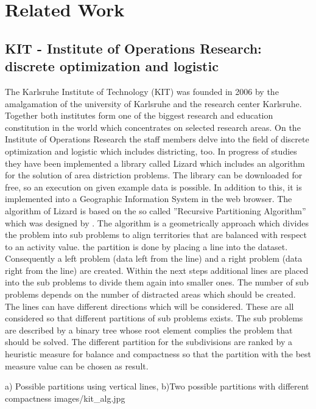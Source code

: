 \section{Related Work}

\subsection{KIT - Institute of Operations Research: discrete optimization and logistic}\label{KIT}

The Karlsruhe Institute of Technology (KIT) was founded in 2006 by the amalgamation of the university of Karlsruhe and the research center Karlsruhe. Together both institutes form one of the biggest research and education constitution in the world which concentrates on selected research areas. On the Institute of Operations Research the staff members delve into the field of discrete optimization and logistic which includes districting, too. In progress of studies they have been implemented a library called Lizard which includes an algorithm for the solution of area distriction problems. The library can be downloaded for free, so an execution on given example data is possible. In addition to this, it is implemented into a Geographic Information System in the web browser. The algorithm of Lizard is based on the so called ''Recursive Partitioning Algorithm'' which was designed by \citeauthor{kalcsics} \cite{kalcsics}. The algorithm is a geometrically approach which divides the problem into sub problems to align territories that are balanced with respect to an activity value. the partition is done by placing a line into the dataset. Consequently a left problem (data left from the line) and a right problem (data right from the line) are created. Within the next steps additional lines are placed into the sub problems to divide them again into smaller ones. The number of sub problems depends on the number of distracted areas which should be created. The lines can have different directions which will be considered. These are all considered so that different partitions of sub problems exists. The sub problems are described by a binary tree whose root element complies the problem that should be solved. The different partition for the subdivisions are ranked by a heuristic measure for balance and compactness so that the partition with the best measure value can be chosen as result.

\begin{figureOwn}{a) Possible partitions using vertical lines, b)Two possible partitions with different compactness \cite{kalcsics}}{images/kit_alg.jpg}\end{figureOwn}

